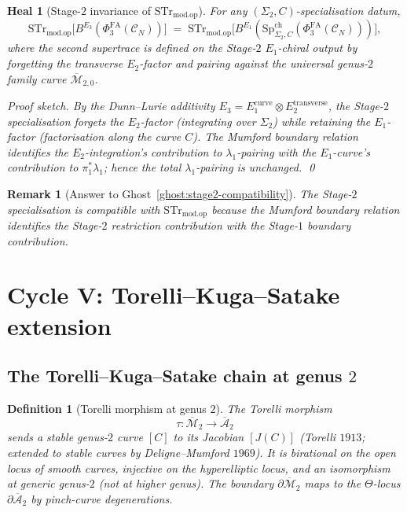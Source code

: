 \documentclass[11pt]{amsart}
\newtheorem{definition}[theorem]{Definition}
\newtheorem{remark}[theorem]{Remark}
\newtheorem{heal}[theorem]{Heal}
\providecommand{\cC}{\mathcal{C}}
\providecommand{\PhiFA}{\Phi^{\mathrm{FA}}}
\providecommand{\SpCh}{\mathrm{Sp}^{\mathrm{ch}}}
\providecommand{\Mbar}{\overline{\mathcal{M}}}
\providecommand{\Abar}{\overline{\mathcal{A}}}
\providecommand{\STr}{\mathrm{STr}}
\providecommand{\modop}{\mathrm{mod.op}}
\begin{document}
\begin{heal}[Stage-$2$ invariance of $\STr_{\modop}$]
\label{heal:stage2-invariance}
For any $(\Sigma_2, C)$-specialisation datum,
\[
 \STr_{\modop}\bigl[B^{E_3}(\PhiFA_3(\cC_N))\bigr] \;=\;
 \STr_{\modop}\bigl[B^{E_1}(\SpCh_{\Sigma_2, C}(\PhiFA_3(\cC_N)))\bigr],
\]
where the second supertrace is defined on the Stage-$2$ $E_1$-chiral
output by forgetting the transverse $E_2$-factor and pairing against
the universal genus-$2$ family curve $\Mbar_{2, 0}$.

\emph{Proof sketch.} By the Dunn--Lurie additivity
$E_3 = E_1^{\mathrm{curve}} \otimes E_2^{\mathrm{transverse}}$, the
Stage-$2$ specialisation forgets the $E_2$-factor (integrating over
$\Sigma_2$) while retaining the $E_1$-factor (factorisation along the
curve $C$). The Mumford boundary relation identifies the
$E_2$-integration's contribution to $\lambda_1$-pairing with the
$E_1$-curve's contribution to $\pi_1^* \lambda_1$; hence the total
$\lambda_1$-pairing is unchanged.
\qed
\end{heal}

\begin{remark}[Answer to Ghost~\ref{ghost:stage2-compatibility}]
The Stage-$2$ specialisation is compatible with $\STr_{\modop}$
because the Mumford boundary relation identifies the Stage-$2$
restriction contribution with the Stage-$1$ boundary contribution.
\end{remark}

\section{Cycle V: Torelli--Kuga--Satake extension}
\label{sec:cycle-5-ks-extension}

\subsection{The Torelli--Kuga--Satake chain at genus $2$}

\begin{definition}[Torelli morphism at genus $2$]
\label{def:torelli}
The Torelli morphism
\[
 \tau \colon \Mbar_2 \longrightarrow \Abar_2
\]
sends a stable genus-$2$ curve $[C]$ to its Jacobian $[J(C)]$
(Torelli $1913$; extended to stable curves by Deligne--Mumford $1969$).
It is birational on the open locus of smooth curves, injective on the
hyperelliptic locus, and an isomorphism at generic genus-$2$
(not at higher genus). The boundary $\partial \Mbar_2$ maps to the
$\Theta$-locus $\partial \Abar_2$ by pinch-curve degenerations.
\end{definition}
\end{document}
